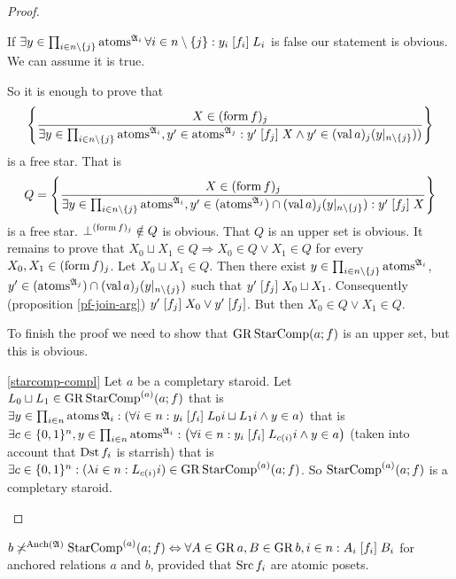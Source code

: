 \begin{proof}
\begin{widedisorder}
If $\exists y\in\prod_{i\in n\setminus\{j\}}\operatorname{atoms}^{\mathfrak{A}_{i}}\forall i\in n\setminus\{j\}:y_{i}\mathrel{\left[f_{i}\right]}L_{i}$
is false our statement is obvious. We can assume it is true.


So it is enough to prove that
\[
\left\{ \frac{X\in(\operatorname{form} f)_{j}}{\exists y\in\prod_{i\in n\setminus\{j\}}\operatorname{atoms}^{\mathfrak{A}_{i}},y'\in\operatorname{atoms}^{\mathfrak{A}_{j}}:y'\mathrel{\left[f_{j}\right]}X\land y'\in(\operatorname{val} a)_{j}(y|_{n\setminus\{j\}}))}\right\}
\]
is a free star. That is
\[
Q=\left\{ \frac{X\in(\operatorname{form} f)_{j}}{\exists y\in\prod_{i\in n\setminus\{j\}}\operatorname{atoms}^{\mathfrak{A}_{i}},y'\in(\operatorname{atoms}^{\mathfrak{A}_{j}})\cap(\operatorname{val} a)_{j}(y|_{n\setminus\{j\}}):y'\mathrel{\left[f_{j}\right]}X}\right\}
\]
is a free star. $\bot^{(\operatorname{form} f)_{j}}\notin Q$ is obvious. That $Q$
is an upper set is obvious. It remains to prove that $X_{0}\sqcup X_{1}\in Q\Rightarrow X_{0}\in Q\vee X_{1}\in Q$
for every $X_{0},X_{1}\in(\operatorname{form} f)_{j}$. Let $X_{0}\sqcup X_{1}\in Q$.
Then there exist $y\in\prod_{i\in n\setminus\{j\}}\operatorname{atoms}^{\mathfrak{A}_{i}}$,
$y'\in(\operatorname{atoms}^{\mathfrak{A}_{j}})\cap(\operatorname{val} a)_{j}(y|_{n\setminus\{j\}})$
such that $y'\mathrel{\left[f_{j}\right]}X_{0}\sqcup X_{1}$. Consequently (proposition
\ref{pf-join-arg}) $y'\mathrel{\left[f_{j}\right]}X_{0}\vee y'\mathrel{\left[f_{j}\right]}$.
But then $X_{0}\in Q\vee X_{1}\in Q$.


To finish the proof we need to show that $\operatorname{GR}\operatorname{StarComp}(a;f)$ is an
upper set, but this is obvious.

\item [{\ref{starcomp-compl}}] Let $a$ be a completary staroid. Let $L_{0}\sqcup L_{1}\in\operatorname{GR}\operatorname{StarComp}^{(a)}(a;f)$
that is $\exists y\in\prod_{i\in n}\operatorname{atoms}\mathfrak{A}_{i}:\left(\forall i\in n:y_{i}\mathrel{\left[f_{i}\right]}L_{0}i\sqcup L_{1}i\wedge y\in a\right)$
that is $\exists c\in\{0,1\}^{n},y\in\prod_{i\in n}\operatorname{atoms}^{\mathfrak{A}_{i}}:\left(\forall i\in n:y_{i}\mathrel{\left[f_{i}\right]}L_{c(i)}i\wedge y\in a\right)$
(taken into account that $\operatorname{Dst} f_{i}$ is starrish) that is $\exists c\in\{0,1\}^{n}:(\lambda i\in n:L_{c(i_{})}i)\in\operatorname{GR}\operatorname{StarComp}^{(a)}(a;f)$.
So $\operatorname{StarComp}^{(a)}(a;f)$ is a completary staroid.
\end{widedisorder}
\end{proof}
\begin{lem}
$b\not\asymp^{\operatorname{Anch}(\mathfrak{A})}\operatorname{StarComp}^{(a)}(a;f)\Leftrightarrow\forall A\in\operatorname{GR} a,B\in\operatorname{GR} b,i\in n:A_{i}\mathrel{\left[f_{i}\right]}B_{i}$
for anchored relations $a$ and $b$, provided that $\operatorname{Src} f_{i}$
are atomic posets.\end{lem}
